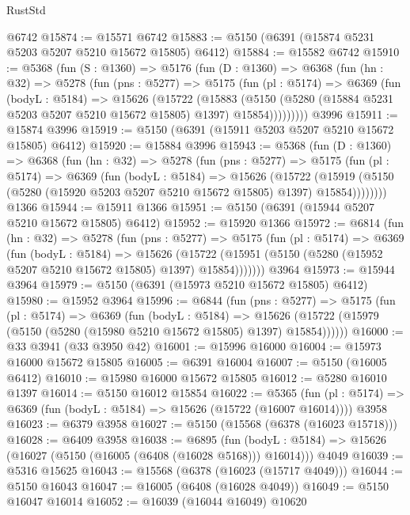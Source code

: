 \begin{lexlean}{RustStd}
\begin{coremodule}
    @6742
@15874 := @15571 @6742
@15883 := @5150 (@6391 (@15874 @5231 @5203 @5207 @5210 @15672 @15805) @6412)
@15884 := @15582 @6742
@15910 := @5368
    (fun (S : @1360) =>
    @5176
      (fun (D : @1360) =>
      @6368
        (fun (hn : @32) =>
        @5278
          (fun (pns : @5277) =>
          @5175
            (fun (pl : @5174) =>
            @6369
              (fun (bodyL : @5184) =>
              @15626
                (@15722
                  (@15883
                    (@5150
                      (@5280 (@15884 @5231 @5203 @5207 @5210 @15672 @15805) @1397)
                      @15854)))))))))
    @3996
@15911 := @15874 @3996
@15919 := @5150 (@6391 (@15911 @5203 @5207 @5210 @15672 @15805) @6412)
@15920 := @15884 @3996
@15943 := @5368
    (fun (D : @1360) =>
    @6368
      (fun (hn : @32) =>
      @5278
        (fun (pns : @5277) =>
        @5175
          (fun (pl : @5174) =>
          @6369
            (fun (bodyL : @5184) =>
            @15626
              (@15722
                (@15919 (@5150 (@5280 (@15920 @5203 @5207 @5210 @15672 @15805) @1397) @15854))))))))
    @1366
@15944 := @15911 @1366
@15951 := @5150 (@6391 (@15944 @5207 @5210 @15672 @15805) @6412)
@15952 := @15920 @1366
@15972 := @6814
    (fun (hn : @32) =>
    @5278
      (fun (pns : @5277) =>
      @5175
        (fun (pl : @5174) =>
        @6369
          (fun (bodyL : @5184) =>
          @15626
            (@15722 (@15951 (@5150 (@5280 (@15952 @5207 @5210 @15672 @15805) @1397) @15854)))))))
    @3964
@15973 := @15944 @3964
@15979 := @5150 (@6391 (@15973 @5210 @15672 @15805) @6412)
@15980 := @15952 @3964
@15996 := @6844
    (fun (pns : @5277) =>
    @5175
      (fun (pl : @5174) =>
      @6369
        (fun (bodyL : @5184) =>
        @15626 (@15722 (@15979 (@5150 (@5280 (@15980 @5210 @15672 @15805) @1397) @15854))))))
@16000 := @33 @3941 (@33 @3950 @42)
@16001 := @15996 @16000
@16004 := @15973 @16000 @15672 @15805
@16005 := @6391 @16004
@16007 := @5150 (@16005 @6412)
@16010 := @15980 @16000 @15672 @15805
@16012 := @5280 @16010 @1397
@16014 := @5150 @16012 @15854
@16022 := @5365
    (fun (pl : @5174) => @6369 (fun (bodyL : @5184) => @15626 (@15722 (@16007 @16014))))
    @3958
@16023 := @6379 @3958
@16027 := @5150 (@15568 (@6378 (@16023 @15718)))
@16028 := @6409 @3958
@16038 := @6895
    (fun (bodyL : @5184) => @15626 (@16027 (@5150 (@16005 (@6408 (@16028 @5168))) @16014)))
    @4049
@16039 := @5316 @15625
@16043 := @15568 (@6378 (@16023 (@15717 @4049)))
@16044 := @5150 @16043
@16047 := @16005 (@6408 (@16028 @4049))
@16049 := @5150 @16047 @16014
@16052 := @16039 (@16044 @16049) @10620

\end{coremodule}
\end{lexlean}
